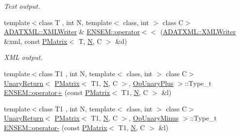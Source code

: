 \begin{DoxyCompactItemize}
\begin{DoxyCompactList}\small\item\em Text output. \end{DoxyCompactList}\item 
{\footnotesize template$<$class T , int N, template$<$ class, int $>$ class C$>$ }\\\mbox{\hyperlink{classADATXML_1_1XMLWriter}{A\+D\+A\+T\+X\+M\+L\+::\+X\+M\+L\+Writer}} \& \mbox{\hyperlink{group__primmatrix_ga88162a3095bbb5b40ba8100093befe2b}{E\+N\+S\+E\+M\+::operator$<$$<$}} (\mbox{\hyperlink{classADATXML_1_1XMLWriter}{A\+D\+A\+T\+X\+M\+L\+::\+X\+M\+L\+Writer}} \&xml, const \mbox{\hyperlink{classENSEM_1_1PMatrix}{P\+Matrix}}$<$ T, \mbox{\hyperlink{adat__devel_2lib_2hadron_2operator__name__util_8cc_a7722c8ecbb62d99aee7ce68b1752f337}{N}}, C $>$ \&d)
\begin{DoxyCompactList}\small\item\em X\+ML output. \end{DoxyCompactList}\item 
{\footnotesize template$<$class T1 , int N, template$<$ class, int $>$ class C$>$ }\\\mbox{\hyperlink{structENSEM_1_1UnaryReturn}{Unary\+Return}}$<$ \mbox{\hyperlink{classENSEM_1_1PMatrix}{P\+Matrix}}$<$ T1, \mbox{\hyperlink{adat__devel_2lib_2hadron_2operator__name__util_8cc_a7722c8ecbb62d99aee7ce68b1752f337}{N}}, C $>$, \mbox{\hyperlink{structENSEM_1_1OpUnaryPlus}{Op\+Unary\+Plus}} $>$\+::Type\+\_\+t \mbox{\hyperlink{group__primmatrix_ga0034bb2111966a353c20e6d171273d4e}{E\+N\+S\+E\+M\+::operator+}} (const \mbox{\hyperlink{classENSEM_1_1PMatrix}{P\+Matrix}}$<$ T1, \mbox{\hyperlink{adat__devel_2lib_2hadron_2operator__name__util_8cc_a7722c8ecbb62d99aee7ce68b1752f337}{N}}, C $>$ \&l)
\item 
{\footnotesize template$<$class T1 , int N, template$<$ class, int $>$ class C$>$ }\\\mbox{\hyperlink{structENSEM_1_1UnaryReturn}{Unary\+Return}}$<$ \mbox{\hyperlink{classENSEM_1_1PMatrix}{P\+Matrix}}$<$ T1, \mbox{\hyperlink{adat__devel_2lib_2hadron_2operator__name__util_8cc_a7722c8ecbb62d99aee7ce68b1752f337}{N}}, C $>$, \mbox{\hyperlink{structENSEM_1_1OpUnaryMinus}{Op\+Unary\+Minus}} $>$\+::Type\+\_\+t \mbox{\hyperlink{group__primmatrix_ga76960c32943a9f55860945f47f02de5b}{E\+N\+S\+E\+M\+::operator-\/}} (const \mbox{\hyperlink{classENSEM_1_1PMatrix}{P\+Matrix}}$<$ T1, \mbox{\hyperlink{adat__devel_2lib_2hadron_2operator__name__util_8cc_a7722c8ecbb62d99aee7ce68b1752f337}{N}}, C $>$ \&l)
\item 

\end{DoxyCompactItemize}
